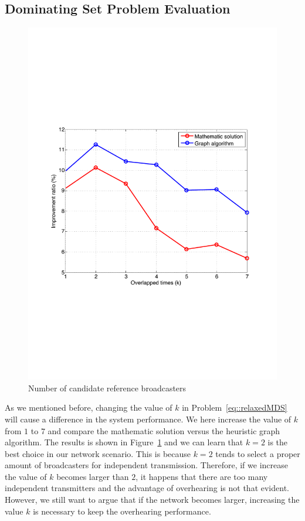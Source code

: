 \subsection{Dominating Set Problem Evaluation}
\label{sec::DSEvaluation}
\begin{figure}
\begin{center}
\includegraphics[width=0.9\columnwidth]{./fig/compareDSAlgorithm.pdf}
\caption{\label{fig::overlapped} Number of candidate reference broadcasters}
\end{center}
\end{figure}
{\color{blue}
As we mentioned before, changing the value of $k$ in
Problem~\eqref{eq::relaxedMDS} will cause a difference in the system
performance.
We here increase the value of $k$ from $1$ to $7$ and compare the mathematic
solution versus the heuristic graph algorithm.
The results is shown in Figure~\ref{fig::overlapped} and we can learn that
$k=2$ is the best choice in our network scenario.
This is because $k=2$ tends to select a proper amount of broadcasters for
independent transmission.
Therefore, if we increase the value of $k$ becomes larger than $2$, it happens
that there are too many independent transmitters and the advantage of
overhearing is not that evident.
However, we still want to argue that if the network becomes larger, increasing
the value $k$ is necessary to keep the overhearing performance.
}

